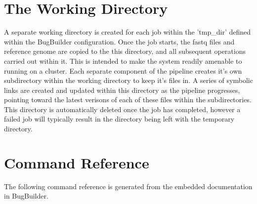 \documentclass[a4paper,twoside,10pt]{article}
\begin{document}
\section{The Working Directory}

A separate working directory is created for each job within the 'tmp\_dir' defined within the
BugBuilder configuration. Once the job starts, the fastq files and reference genome are copied to
the this directory, and all subsequent operations carried out within it.  This is intended to make
the system readily amenable to running on a cluster.  Each separate component of the pipeline
creates it's own subdirectory within the working directory to keep it's files in. 
A series of symbolic links are created and updated within this directory as the pipeline
progresses, pointing toward the latest verisons of each of these files within the subdirectories.
This directory is automatically deleted once the job has completed, however a failed job will
typically result in the directory being left with the temporary directory.


\section{Command Reference}

The following command reference is generated from the embedded documentation in BugBuilder. 


\end{document}
